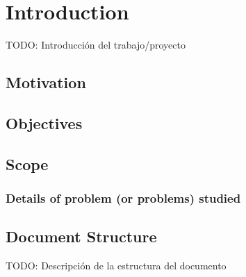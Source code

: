 \chapter{Introduction\label{chap:introduction}}

TODO: Introducción del trabajo/proyecto

\section{Motivation}
\section{Objectives}

\section{Scope}
\subsection{Details of problem (or problems) studied}

\section{Document Structure}

TODO: Descripción de la estructura del documento
